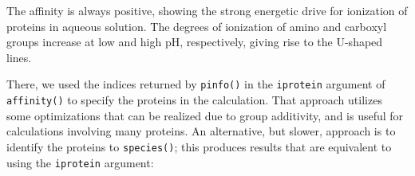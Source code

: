 \documentclass[]{tufte-handout}
\newenvironment{Shaded}{}{}
\newcommand{\KeywordTok}[1]{\textcolor[rgb]{0.00,0.44,0.13}{\textbf{#1}}}
\newcommand{\DataTypeTok}[1]{\textcolor[rgb]{0.56,0.13,0.00}{#1}}
\newcommand{\DecValTok}[1]{\textcolor[rgb]{0.25,0.63,0.44}{#1}}
\newcommand{\FloatTok}[1]{\textcolor[rgb]{0.25,0.63,0.44}{#1}}
\newcommand{\StringTok}[1]{\textcolor[rgb]{0.25,0.44,0.63}{#1}}
\newcommand{\ControlFlowTok}[1]{\textcolor[rgb]{0.00,0.44,0.13}{\textbf{#1}}}
\newcommand{\OperatorTok}[1]{\textcolor[rgb]{0.40,0.40,0.40}{#1}}
\newcommand{\NormalTok}[1]{#1}
\begin{document}
\begin{Shaded}
\end{Shaded}

The affinity is always positive, showing the strong energetic drive for
ionization of proteins in aqueous solution. The degrees of ionization of
amino and carboxyl groups increase at low and high pH, respectively,
giving rise to the U-shaped lines.

There, we used the indices returned by {\texttt{pinfo()}} in the
\texttt{iprotein} argument of {\texttt{affinity()}} to specify the
proteins in the calculation. That approach utilizes some optimizations
that can be realized due to group additivity, and is useful for
calculations involving many proteins. An alternative, but slower,
approach is to identify the proteins to {\texttt{species()}}; this
produces results that are equivalent to using the \texttt{iprotein}
argument:
\end{document}
